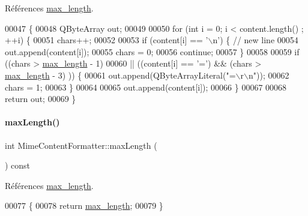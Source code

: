 Références \hyperlink{class_simple_mail_1_1_mime_content_formatter_a5c7278fb3bd794bc4ff408169cfef6fd}{max\+\_\+length}.


\begin{DoxyCode}
00047 \{
00048     QByteArray out;
00049 
00050     \textcolor{keywordflow}{for} (\textcolor{keywordtype}{int} i = 0; i < content.length() ; ++i) \{
00051         chars++;
00052 
00053         \textcolor{keywordflow}{if} (content[i] == \textcolor{charliteral}{'\(\backslash\)n'}) \{       \textcolor{comment}{// new line}
00054             out.append(content[i]);
00055             chars = 0;
00056             \textcolor{keywordflow}{continue};
00057         \}
00058 
00059         \textcolor{keywordflow}{if} ((chars > \hyperlink{class_simple_mail_1_1_mime_content_formatter_a5c7278fb3bd794bc4ff408169cfef6fd}{max\_length} - 1)
00060                 || ((content[i] == \textcolor{charliteral}{'='}) && (chars > \hyperlink{class_simple_mail_1_1_mime_content_formatter_a5c7278fb3bd794bc4ff408169cfef6fd}{max\_length} - 3) )) \{
00061             out.append(QByteArrayLiteral(\textcolor{stringliteral}{"=\(\backslash\)r\(\backslash\)n"}));
00062             chars = 1;
00063         \}
00064 
00065         out.append(content[i]);
00066     \}
00067 
00068     \textcolor{keywordflow}{return} out;
00069 \}
\end{DoxyCode}
\mbox{\label{class_simple_mail_1_1_mime_content_formatter_a47f6976ee76be112da5dd610c7862d4b}} 
\paragraph{\texorpdfstring{max\+Length()}{maxLength()}}
{\footnotesize\ttfamily int Mime\+Content\+Formatter\+::max\+Length (\begin{DoxyParamCaption}{ }\end{DoxyParamCaption}) const}



Références \hyperlink{class_simple_mail_1_1_mime_content_formatter_a5c7278fb3bd794bc4ff408169cfef6fd}{max\+\_\+length}.


\begin{DoxyCode}
00077 \{
00078     \textcolor{keywordflow}{return} \hyperlink{class_simple_mail_1_1_mime_content_formatter_a5c7278fb3bd794bc4ff408169cfef6fd}{max\_length};
00079 \}
\end{DoxyCode}
\mbox{\label{class_simple_mail_1_1_mime_content_formatter_af982d5e4c2fd25d72ef45a3b69f99593}} 
